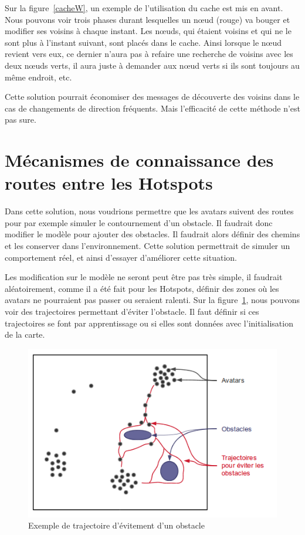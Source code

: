 \documentclass[11pt,a4paper]{article}
\begin{document}
\par Sur la figure~\ref{cacheW}, un exemple de l'utilisation du cache est mis en avant. Nous pouvons voir trois phases durant lesquelles un nœud (rouge) va bouger et modifier ses voisins à chaque instant. Les nœuds, qui étaient voisins et qui ne le sont plus à l'instant suivant, sont placés dans le cache. Ainsi lorsque le nœud revient vers eux, ce dernier n'aura pas à refaire une recherche de voisins avec les deux nœuds verts, il aura juste à demander aux nœud verts si ils sont toujours au même endroit, etc.
\par Cette solution pourrait économiser des messages de découverte des voisins dans le cas de changements de direction fréquents. Mais l'efficacité de cette méthode n'est pas sure. 
 
\section{Mécanismes de connaissance des routes entre les Hotspots}
Dans cette solution, nous voudrions permettre que les avatars suivent des routes pour par exemple simuler le contournement d'un obstacle. Il faudrait donc modifier le modèle pour ajouter des obstacles. Il faudrait alors définir des chemins et les conserver dans l'environnement. Cette solution permettrait de simuler un comportement réel, et ainsi d'essayer d'améliorer cette situation.
\par Les modification sur le modèle ne seront peut être pas très simple, il faudrait aléatoirement, comme il a été fait pour les Hotspots, définir des zones où les avatars ne pourraient pas passer ou seraient ralenti. Sur la figure~\ref{trajobstacle}, nous pouvons voir des trajectoires permettant d'éviter l'obstacle. Il faut définir si ces trajectoires se font par apprentissage ou si elles sont données avec l'initialisation de la carte.
	\begin{figure}[!h]
        \centering
        \includegraphics[scale=0.55]{./images/trajobstacle}
        \caption{Exemple de trajectoire d'évitement d'un obstacle}
        \label{trajobstacle}
	\end{figure}
\end{document}
